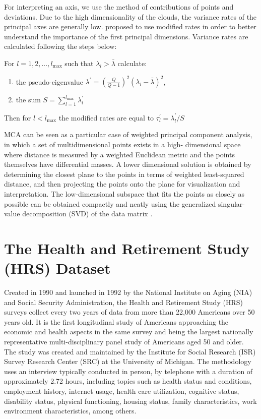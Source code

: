 \documentclass[conference,final,]{IEEEtran}
\begin{document}
For interpreting an axis, we use the method of contributions of points
and deviations. Due to the high dimensionality of the clouds, the
variance rates of the principal axes are generally low.
\cite{benzecri1992correspondence} proposed to use modified rates in
order to better understand the importance of the first principal
dimensions. Variance rates are calculated following the steps below:

For \(l = 1,2,...,l_{\max}\) such that \(\lambda_l > \bar{\lambda}\)
calculate:

\begin{enumerate}
\def\labelenumi{\arabic{enumi}.}
\item
  the pseudo-eigenvalue
  \(\lambda^\prime = \left( \frac{Q}{Q-1} \right)^2(\lambda_l - \bar{\lambda})^2\),
\item
  the sum \(S=\sum_{l=1}^{l_{\max}} \lambda^{\prime} _l\)
\end{enumerate}

Then for \(l < l_{\max}\) the modified rates are equal to
\(\tau^\prime _l = \lambda^\prime_l / S\)

MCA can be seen as a particular case of weighted principal component
analysis, in which a set of multidimensional points exists in a high-
dimensional space where distance is measured by a weighted Euclidean
metric and the points themselves have differential masses. A lower
dimensional solution is obtained by determining the closest plane to the
points in terms of weighted least-squared distance, and then projecting
the points onto the plane for visualization and interpretation. The
low-dimensional subspace that fits the points as closely as possible can
be obtained compactly and neatly using the generalized singular-value
decomposition (SVD) of the data matrix \cite{greenacre2006multiple}.

\hypertarget{the-health-and-retirement-study-hrs-dataset}{%
\section{The Health and Retirement Study (HRS)
Dataset}\label{the-health-and-retirement-study-hrs-dataset}}

Created in 1990 and launched in 1992 by the National Institute on Aging
(NIA) and Social Security Administration, the Health and Retirement
Study (HRS) surveys collect every two years of data from more than
22,000 Americans over 50 years old. It is the first longitudinal study
of Americans approaching the economic and health aspects in the same
survey and being the largest nationally representative
multi-disciplinary panel study of Americans aged 50 and older. The study
was created and maintained by the Institute for Social Research (ISR)
Survey Research Center (SRC) at the University of Michigan. The
methodology uses an interview typically conducted in person, by
telephone with a duration of approximately 2.72 hours, including topics
such as health status and conditions, employment history, internet
usage, health care utilization, cognitive status, disability status,
physical functioning, housing status, family characteristics, work
environment characteristics, among others.
\end{document}
